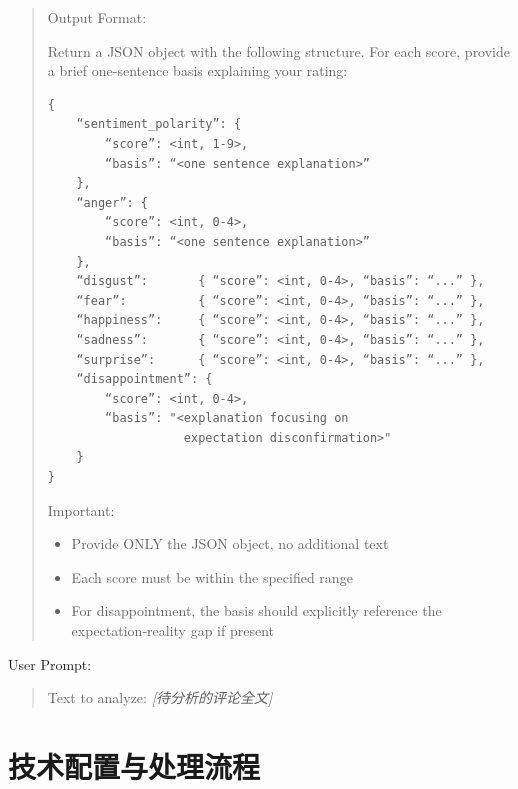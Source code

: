 \documentclass[
    type = master, %
    degree = professional,        %
    decl-page,  %
    twoside,                %
    fontset = fandol %
  ]{njuthesis}
\begin{document}
\begin{quote}
\medskip
Output Format:

Return a JSON object with the following structure. For each score, provide a brief
one-sentence basis explaining your rating:

\begin{verbatim}
{
    “sentiment_polarity”: {
        “score”: <int, 1-9>,
        “basis”: “<one sentence explanation>”
    },
    “anger”: {
        “score”: <int, 0-4>,
        “basis”: “<one sentence explanation>”
    },
    “disgust”:       { “score”: <int, 0-4>, “basis”: “...” },
    “fear”:          { “score”: <int, 0-4>, “basis”: “...” },
    “happiness”:     { “score”: <int, 0-4>, “basis”: “...” },
    “sadness”:       { “score”: <int, 0-4>, “basis”: “...” },
    “surprise”:      { “score”: <int, 0-4>, “basis”: “...” },
    “disappointment”: {
        “score”: <int, 0-4>,
        “basis”: "<explanation focusing on
                   expectation disconfirmation>"
    }
}
\end{verbatim}

Important:
\begin{itemize}
  \item Provide ONLY the JSON object, no additional text
  \item Each score must be within the specified range
  \item For disappointment, the basis should explicitly reference the expectation-reality gap if present
\end{itemize}
\end{quote}

\vspace{0.5em}
\noindent User Prompt:
\begin{quote}\small
Text to analyze: \textit{[待分析的评论全文]}
\end{quote}

\section{技术配置与处理流程}
\end{document}
